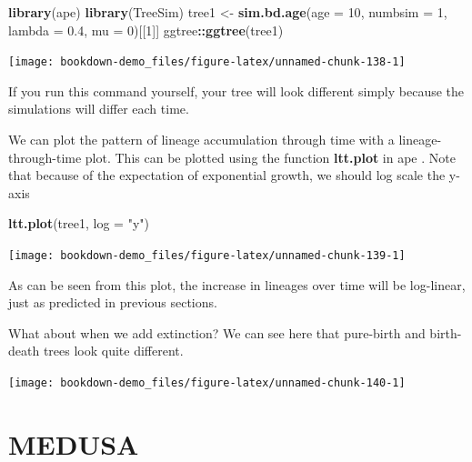 \documentclass[
]{book}
\newenvironment{Shaded}{\begin{snugshade}}{\end{snugshade}}
\newcommand{\DataTypeTok}[1]{\textcolor[rgb]{0.13,0.29,0.53}{#1}}
\newcommand{\DecValTok}[1]{\textcolor[rgb]{0.00,0.00,0.81}{#1}}
\newcommand{\FloatTok}[1]{\textcolor[rgb]{0.00,0.00,0.81}{#1}}
\newcommand{\KeywordTok}[1]{\textcolor[rgb]{0.13,0.29,0.53}{\textbf{#1}}}
\newcommand{\NormalTok}[1]{#1}
\newcommand{\OperatorTok}[1]{\textcolor[rgb]{0.81,0.36,0.00}{\textbf{#1}}}
\newcommand{\StringTok}[1]{\textcolor[rgb]{0.31,0.60,0.02}{#1}}
\begin{document}
\begin{Shaded}
\begin{Highlighting}[]
\KeywordTok{library}\NormalTok{(ape)}
\KeywordTok{library}\NormalTok{(TreeSim)}
\NormalTok{tree1 \textless{}{-}}\StringTok{ }\KeywordTok{sim.bd.age}\NormalTok{(}\DataTypeTok{age =} \DecValTok{10}\NormalTok{, }\DataTypeTok{numbsim =} \DecValTok{1}\NormalTok{, }\DataTypeTok{lambda =} \FloatTok{0.4}\NormalTok{, }\DataTypeTok{mu =} \DecValTok{0}\NormalTok{)[[}\DecValTok{1}\NormalTok{]]}
\NormalTok{ggtree}\OperatorTok{::}\KeywordTok{ggtree}\NormalTok{(tree1)}
\end{Highlighting}
\end{Shaded}

\begin{center}\texttt{[image: bookdown-demo\_files/figure-latex/unnamed-chunk-138-1]} \end{center}

If you run this command yourself, your tree will look different simply because the simulations will differ each time.

We can plot the pattern of lineage accumulation through time with a lineage-through-time plot. This can be plotted using the function \textbf{ltt.plot} in ape \citep{ape}. Note that because of the expectation of exponential growth, we should log scale the y-axis

\begin{Shaded}
\begin{Highlighting}[]
\KeywordTok{ltt.plot}\NormalTok{(tree1, }\DataTypeTok{log =} \StringTok{"y"}\NormalTok{)}
\end{Highlighting}
\end{Shaded}

\begin{center}\texttt{[image: bookdown-demo\_files/figure-latex/unnamed-chunk-139-1]} \end{center}

As can be seen from this plot, the increase in lineages over time will be log-linear, just as predicted in previous sections.

What about when we add extinction? We can see here that pure-birth and birth-death trees look quite different.

\begin{center}\texttt{[image: bookdown-demo\_files/figure-latex/unnamed-chunk-140-1]} \end{center}

\hypertarget{medusa}{%
\section{MEDUSA}\label{medusa}}
\end{document}
